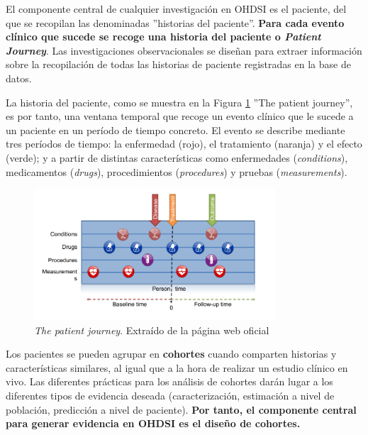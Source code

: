 
El componente central de cualquier investigación en OHDSI es el paciente, del que se recopilan las denominadas ''historias del paciente''. \textbf{Para cada evento clínico que sucede se recoge una historia del paciente o \textit{Patient Journey}}. %
Las investigaciones observacionales se diseñan para extraer información sobre la recopilación de todas las historias de paciente registradas en la base de datos.

La historia del paciente,  como se muestra en la Figura \ref{fig:patientJourney} ''The patient journey'', es por tanto, una ventana temporal que recoge un evento clínico que le sucede a un paciente en un período de tiempo concreto. El evento se describe mediante tres períodos de tiempo: la enfermedad (rojo), el tratamiento (naranja) y el efecto (verde); y a partir de distintas características como enfermedades (\textit{conditions}), medicamentos (\textit{drugs}), procedimientos (\textit{procedures}) y pruebas (\textit{measurements}).

\begin{figure}[H]
    \centering
    \includegraphics[width=0.80\textwidth]{figures/patientJourney.png}
     \caption{\textit{The patient journey}. Extraído de la página web oficial \parencite{OHDSIbook}}
    \label{fig:patientJourney}
\end{figure}

Los pacientes se pueden agrupar en \textbf{cohortes} cuando comparten historias y características similares, al igual que a la hora de realizar un estudio clínico en vivo. Las diferentes  prácticas para los análisis de cohortes darán lugar a los diferentes tipos de evidencia deseada (caracterización, estimación a nivel de población, predicción a nivel de paciente). \textbf{Por tanto, el componente central para generar evidencia en OHDSI es el diseño de cohortes.}

